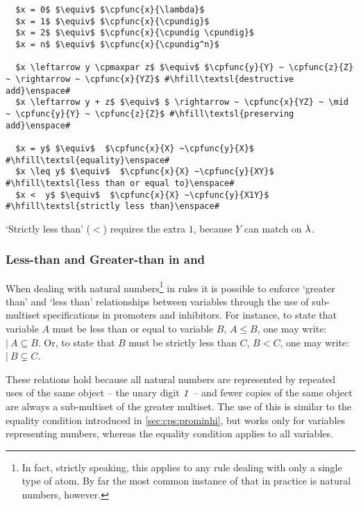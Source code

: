 \lstset{xleftmargin=.5in, xrightmargin=.5in} 
\begin{lstlisting}
  $x = 0$ $\equiv$ $\cpfunc{x}{\lambda}$
  $x = 1$ $\equiv$ $\cpfunc{x}{\cpundig}$
  $x = 2$ $\equiv$ $\cpfunc{x}{\cpundig \cpundig}$
  $x = n$ $\equiv$ $\cpfunc{x}{\cpundig^n}$
  
  $x \leftarrow y \cpmaxpar z$ $\equiv$ $\cpfunc{y}{Y} ~ \cpfunc{z}{Z} ~ \rightarrow ~ \cpfunc{x}{YZ}$ #\hfill\textsl{destructive add}\enspace#
  $x \leftarrow y + z$ $\equiv$ $ \rightarrow ~ \cpfunc{x}{YZ} ~ \mid ~ \cpfunc{y}{Y} ~ \cpfunc{z}{Z}$ #\hfill\textsl{preserving add}\enspace#
  
  $x = y$ $\equiv$  $\cpfunc{x}{X} ~\cpfunc{y}{X}$ #\hfill\textsl{equality}\enspace#
  $x \leq y$ $\equiv$  $\cpfunc{x}{X} ~\cpfunc{y}{XY}$ #\hfill\textsl{less than or equal to}\enspace#
  $x <  y$ $\equiv$  $\cpfunc{x}{X} ~\cpfunc{y}{X1Y}$ #\hfill\textsl{strictly less than}\enspace#
\end{lstlisting}
\noindent
`Strictly less than' (\(<\)) requires the extra \(1\), because \(Y\) can match on \(\lambda\).

\subsubsection{Less-than and Greater-than in  and }

When dealing with natural numbers\footnote{In fact, strictly speaking, this applies to any rule dealing with only a single type of atom.  By far the most common instance of that in practice is natural numbers, however.} in rules it is possible to enforce `greater than' and `less than' relationships between variables through the use of sub-multiset specifications in \glspl{promoter} and \glspl{inhibitor}.  For instance, to state that variable \(A\) must be less than or equal to variable \(B\), \ie{} \(A \leq B\), one may write: \(|~ A \subseteq B\).  Or, to state that \(B\) must be strictly less than \(C\), \ie{} \(B < C\), one may write: \(|~ B \subsetneq C\).

These relations hold because all natural numbers are represented by repeated uses of the same object -- the unary digit \(\mathit{1}\) -- and fewer copies of the same object are always a sub-multiset of the greater multiset.  The use of this is similar to the equality condition introduced in \cref{sec:cps:prominhi}, but works only for variables representing numbers, whereas the equality condition applies to all variables. 

